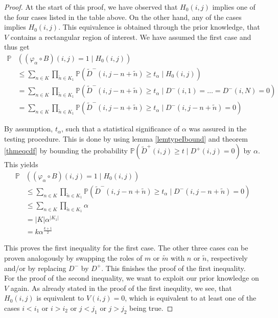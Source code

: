 \documentclass[a4paper,12pt]{article}
\newcommand{\abs}[1]{\lvert#1\rvert}
\theoremstyle{plain}
\theoremstyle{definition}
\theoremstyle{remark}
\begin{document}
\begin{proof}
	At the start of this proof, we have observed that $H_0(i, j)$ implies one of the four cases listed in the table above. On the other hand, any of the cases implies $H_0(i, j)$. This equivalence is obtained through the prior knowledge, that $V$ contains a rectangular region of interest. We have assumed the first case and thus get
	\begin{align*}
		\mathbb{P}&( (\varphi_\alpha \circ B)(i, j) = 1 \mid H_0(i, j) ) \\
		&\leq \sum_{n \in K} \prod_{\tilde{n} \in K_1} \mathbb{P}\left( \tilde{D}^-(i, j - n + \tilde{n}) \geq t_\alpha \mid H_0(i, j) \right) \\
		&= \sum_{n \in K} \prod_{\tilde{n} \in K_1} \mathbb{P}\left( \tilde{D}^-(i, j - n + \tilde{n}) \geq t_\alpha \mid D^-(i, 1) = \dots = D^-(i, N) = 0 \right) \\
		&= \sum_{n \in K} \prod_{\tilde{n} \in K_1} \mathbb{P}\left( \tilde{D}^-(i, j - n + \tilde{n}) \geq t_\alpha \mid D^-(i, j - n + \tilde{n}) = 0 \right)
	\end{align*}
	
	By assumption, $t_\alpha$, such that a statistical significance of $\alpha$ was assured in the testing procedure. This is done by using lemma \ref{lemtypeIbound} and theorem \ref{thmeqcdf} by bounding the probability $\mathbb{P}(\tilde{D}^+(i, j) \geq t \mid D^+(i, j) = 0)$ by $\alpha$. This yields
	\begin{align*}
		\mathbb{P}&( (\varphi_\alpha \circ B)(i, j) = 1 \mid H_0(i, j) ) \\
		&\leq \sum_{n \in K} \prod_{\tilde{n} \in K_1} \mathbb{P}\left( \tilde{D}^-(i, j - n + \tilde{n}) \geq t_\alpha \mid D^-(i, j - n + \tilde{n}) = 0 \right) \\
		&\leq \sum_{n \in K} \prod_{\tilde{n} \in K_1} \alpha \\
		&= \abs{K} \alpha^{\abs{K_1}} \\
		&= k \alpha^{\frac{k+1}{2}}
	\end{align*}
	
	This proves the first inequality for the first case. The other three cases can be proven analogously by swapping the roles of $m$ or $\tilde{m}$ with $n$ or $\tilde{n}$, respectively and/or by replacing $D^-$ by $D^+$. This finishes the proof of the first inequality.\\
	
	
	For the proof of the second inequality, we want to exploit our prior knowledge on $V$ again. As already stated in the proof of the first inequlity, we see, that $H_0(i, j)$ is equivalent to $V(i, j) = 0$, which is equivalent to at least one of the cases $i < i_1$ or $i > i_2$ or $j < j_1$ or $j > j_2$ being true.
	

\end{proof}
\end{document}
